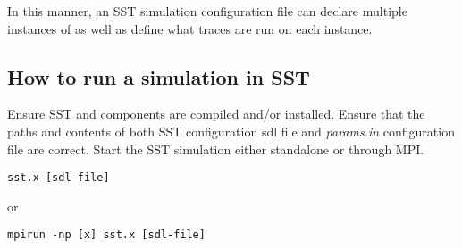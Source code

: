 In this manner, an SST simulation configuration file can declare multiple 
instances of \SIM as well as define what traces are run on each \SIM instance.

\subsection{How to run a \SIM simulation in SST}

Ensure SST and \SIM components are compiled and/or installed.  
Ensure that the paths and contents of both SST configuration sdl file and
\SIM \textit{params.in} configuration file are correct. Start the SST simulation 
either standalone or through MPI.

\begin{lstlisting}
sst.x [sdl-file]
\end{lstlisting}
or
\begin{lstlisting}
mpirun -np [x] sst.x [sdl-file]
\end{lstlisting}

